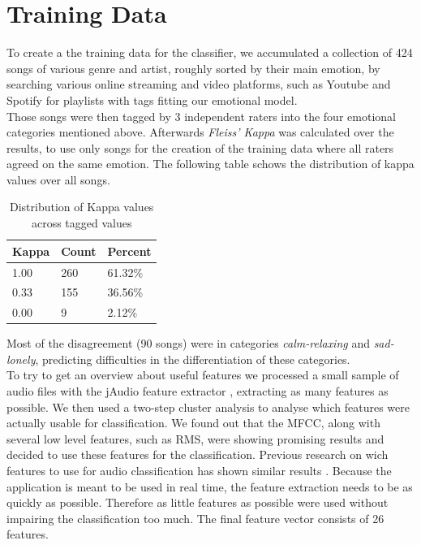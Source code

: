 \documentclass{sigchi-ext}
\begin{document}
\section{Training Data}\label{training-data}
To create a the training data for the classifier, we accumulated a collection of 424 songs of various genre and artist, roughly sorted by their main emotion, by searching various online streaming and video platforms, such as Youtube and Spotify for playlists with tags fitting our emotional model.\\
Those songs were then tagged by 3 independent raters into the four emotional categories mentioned above. Afterwards \textit{Fleiss' Kappa} was calculated over the results, to use only songs for the creation of the training data where all raters agreed on the same emotion. The following table schows the distribution of kappa values over all songs.\\

\begin{table}
  \centering
  \label{kappa-distribution}
  \begin{tabular}{@{}lll@{}}
    Kappa & Count & Percent \\ \midrule
    1.00 & 260 & 61.32\% \\
    0.33 & 155 & 36.56\% \\
    0.00 & 9 	 & 2.12\%
  \end{tabular}
  \caption{Distribution of Kappa values across tagged values}
\end{table}

Most of the disagreement (90 songs) were in categories \textit{calm-relaxing} and \textit{sad-lonely}, predicting difficulties in the differentiation of these categories.\\

To try to get an overview about useful features we processed a small sample of audio files with the jAudio feature extractor \cite{McEnnis2005}, extracting as many features as possible. We then used a two-step cluster analysis to analyse which features were actually usable for classification. We found out that the MFCC, along with several low level features, such as RMS, were showing promising results and decided to use these features for the classification. Previous research on wich features to use for audio classification has shown similar results \cite{Mckinney2003, Mandel2005, Tzanetakis2001}. Because the application is meant to be used in real time, the feature extraction needs to be as quickly as possible. Therefore as little features as possible were used without impairing the classification too much. The final feature vector consists of 26 features.
\end{document}
